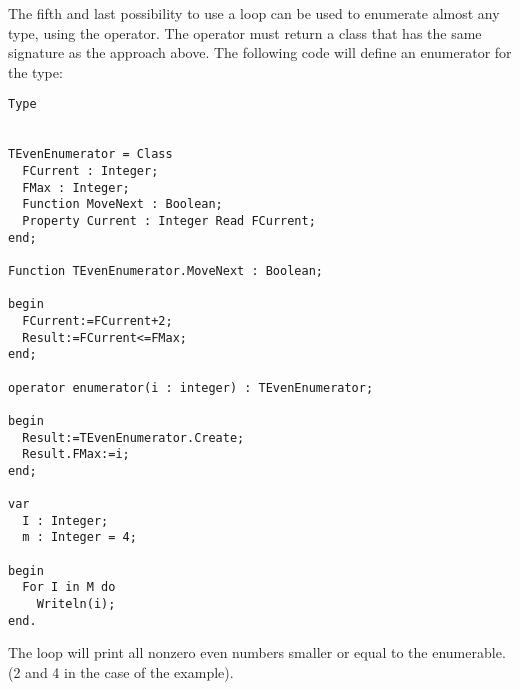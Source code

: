 The fifth and last possibility to use a  loop can be used to 
enumerate almost any type, using the  operator. 
The  operator must return a class that has the same
signature as the  approach above. The following code will
define an enumerator for the  type:
\begin{verbatim}
Type


TEvenEnumerator = Class
  FCurrent : Integer;
  FMax : Integer;
  Function MoveNext : Boolean;
  Property Current : Integer Read FCurrent;
end;

Function TEvenEnumerator.MoveNext : Boolean;

begin
  FCurrent:=FCurrent+2;
  Result:=FCurrent<=FMax;
end;

operator enumerator(i : integer) : TEvenEnumerator;

begin
  Result:=TEvenEnumerator.Create;
  Result.FMax:=i;
end;

var
  I : Integer;
  m : Integer = 4;

begin
  For I in M do
    Writeln(i);
end.
\end{verbatim}
The loop will print all nonzero even numbers smaller or equal to the
enumerable. (2 and 4 in the case of the example).

